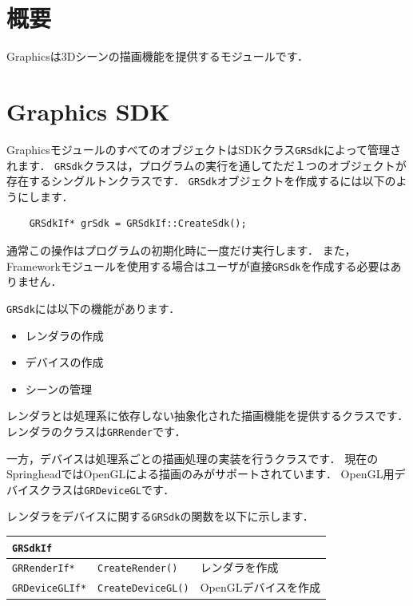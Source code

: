 \section{概要}

Graphicsは3Dシーンの描画機能を提供するモジュールです．

\section{Graphics SDK}

GraphicsモジュールのすべてのオブジェクトはSDKクラス\texttt{GRSdk}によって管理されます．
\texttt{GRSdk}クラスは，プログラムの実行を通してただ１つのオブジェクトが存在するシングルトンクラスです．
\texttt{GRSdk}オブジェクトを作成するには以下のようにします．
\begin{verbatim}
    GRSdkIf* grSdk = GRSdkIf::CreateSdk();
\end{verbatim}
\KLUDGE 通常この操作はプログラムの初期化時に一度だけ実行します．
\KLUDGE また，Frameworkモジュールを使用する場合はユーザが直接\texttt{GRSdk}を作成する必要はありません．

\texttt{GRSdk}には以下の機能があります．
\begin{itemize}
\item レンダラの作成
\item デバイスの作成
\item シーンの管理
\end{itemize}

\KLUDGE レンダラとは処理系に依存しない抽象化された描画機能を提供するクラスです．
\KLUDGE レンダラのクラスは\texttt{GRRender}です．

\KLUDGE 一方，デバイスは処理系ごとの描画処理の実装を行うクラスです．
\KLUDGE 現在のSpringheadではOpenGLによる描画のみがサポートされています．
OpenGL用デバイスクラスは\texttt{GRDeviceGL}です．

\KLUDGE レンダラをデバイスに関する\texttt{GRSdk}の関数を以下に示します．

\begin{center}
\begin{tabular}{p{.2\hsize}p{.40\hsize}p{.3\hsize}}
\texttt{GRSdkIf}		&								&	\\ \midrule
\texttt{GRRenderIf*} 	& \texttt{CreateRender()}		& レンダラを作成		\\
\texttt{GRDeviceGLIf*} 	& \texttt{CreateDeviceGL()}		& OpenGLデバイスを作成	\\
\end{tabular}
\end{center}

